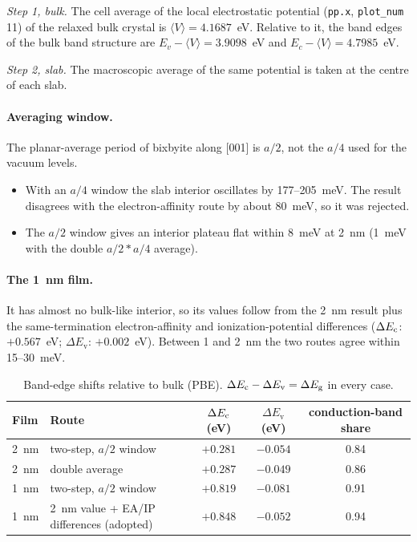 \emph{Step 1, bulk.} The cell average of the local electrostatic potential (\texttt{pp.x}, \texttt{plot\_num} 11) of
the relaxed bulk crystal is $\langle V\rangle = 4.1687$~eV. Relative to it, the band edges of the bulk band structure
are $E_v - \langle V\rangle = 3.9098$~eV and $E_c - \langle V\rangle = 4.7985$~eV.

\emph{Step 2, slab.} The macroscopic average of the same potential is taken at the centre of each slab.

\paragraph{Averaging window.} The planar-average period of bixbyite along [001] is $a/2$, not the $a/4$ used for the
vacuum levels.
\begin{itemize}
\item With an $a/4$ window the slab interior oscillates by 177--205~meV. The result disagrees with the
electron-affinity route by about 80~meV, so it was rejected.
\item The $a/2$ window gives an interior plateau flat within 8~meV at 2~nm (1~meV with the double $a/2\ast a/4$
average).
\end{itemize}

\paragraph{The 1~nm film.} It has almost no bulk-like interior, so its values follow from the 2~nm result plus the
same-termination electron-affinity and ionization-potential differences ($\Delta E_{\mathrm{c}}$: $+0.567$~eV; $\Delta E_{\mathrm{v}}$:
$+0.002$~eV). Between 1 and 2~nm the two routes agree
within 15--30~meV.

\begin{table}[htbp]\centering\small
\caption{Band-edge shifts relative to bulk (PBE). $\Delta E_{\mathrm{c}} - \Delta E_{\mathrm{v}} = \Delta E_{\mathrm{g}}$ in every case.}
\label{tab:dft-partition}
\begin{tabular}{llccc}\toprule
Film & Route & $\Delta E_{\mathrm{c}}$ (eV) & $\Delta E_{\mathrm{v}}$ (eV) & conduction-band share\\\midrule
2~nm & two-step, $a/2$ window & $+0.281$ & $-0.054$ & 0.84\\
2~nm & double average & $+0.287$ & $-0.049$ & 0.86\\
1~nm & two-step, $a/2$ window & $+0.819$ & $-0.081$ & 0.91\\
1~nm & 2~nm value + EA/IP differences (adopted) & $+0.848$ & $-0.052$ & 0.94\\\bottomrule
\end{tabular}
\end{table}

